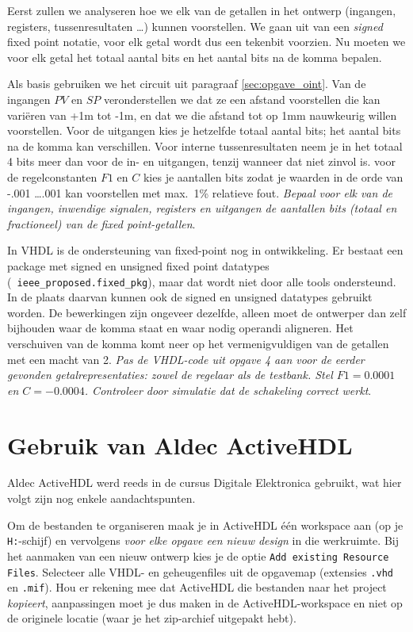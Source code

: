 \normalsize{Eerst zullen we analyseren hoe we elk van de getallen in het ontwerp
(ingangen, registers, tussenresultaten \ldots) kunnen voorstellen. We
gaan uit van een {\em signed} fixed point notatie, voor elk getal
wordt dus een tekenbit voorzien. Nu moeten we voor elk getal het
totaal aantal bits en het aantal bits na de komma bepalen. }

Als basis gebruiken we het circuit uit paragraaf
\ref{sec:opgave_oint}.  Van de ingangen $PV$ en $SP$ veronderstellen
we dat ze een afstand voorstellen die kan vari\"eren van +1m tot -1m,
en dat we die afstand tot op 1mm nauwkeurig willen voorstellen. Voor
de uitgangen kies je hetzelfde totaal aantal bits; het aantal bits na
de komma kan verschillen. Voor interne tussenresultaten neem je in het
totaal 4 bits meer dan voor de in- en uitgangen, tenzij wanneer dat
niet zinvol is. voor de regelconstanten $F1$ en $C$ kies je aantallen
bits zodat je waarden in de orde van -.001 \ldots .001 kan voorstellen
met max.\ 1\% relatieve fout. {\em Bepaal voor elk van de ingangen,
inwendige signalen, registers en uitgangen de aantallen bits (totaal
en fractioneel) van de fixed point-getallen}.

In VHDL is de ondersteuning van fixed-point nog in ontwikkeling. Er
bestaat een package met signed en unsigned fixed point datatypes \\ ({\tt
ieee\_proposed.fixed\_pkg}), maar dat wordt niet door alle tools
ondersteund. In de plaats daarvan kunnen ook de signed en unsigned
datatypes gebruikt worden. De bewerkingen zijn ongeveer dezelfde,
alleen moet de ontwerper dan zelf bijhouden waar de komma staat en
waar nodig operandi aligneren. Het verschuiven van de komma komt neer
op het vermenigvuldigen van de getallen met een macht van 2. {\em Pas
de VHDL-code uit opgave 4 aan voor de eerder gevonden
getalrepresentaties: zowel de regelaar als de testbank. Stel
$F1=0.0001$ en $C=-0.0004$. Controleer door simulatie dat de
schakeling correct werkt}.

\newpage

\appendix
\section{Gebruik van Aldec ActiveHDL}

Aldec ActiveHDL werd reeds in de cursus Digitale Elektronica gebruikt,
wat hier volgt zijn nog enkele aandachtspunten.

Om de bestanden te organiseren maak je in ActiveHDL \'e\'en workspace
aan (op je {\tt H:}-schijf) en vervolgens {\em voor elke opgave een
nieuw design} in die werkruimte. Bij het aanmaken van een nieuw
ontwerp kies je de optie {\tt Add existing Resource Files}. Selecteer
alle VHDL- en geheugenfiles uit de opgavemap (extensies {\tt .vhd} en
{\tt .mif}). Hou er rekening mee dat ActiveHDL die bestanden naar het
project {\em kopieert}, aanpassingen moet je dus maken in de
ActiveHDL-workspace en niet op de originele locatie (waar je het
zip-archief uitgepakt hebt).

